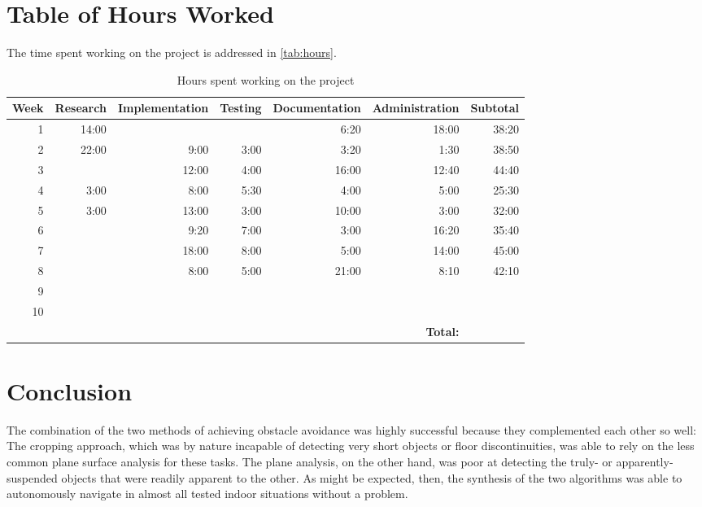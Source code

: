 \documentclass[12pt]{report}
\begin{document}
\section{Table of Hours Worked}
The time spent working on the project is addressed in \autoref{tab:hours}.
\begin{table}
\caption{Hours spent working on the project}
\label{tab:hours}
\begin{tabular}{| r | r | r | r | r | r | r |}
\hline
\scriptsize\textbf{Week} & \scriptsize\textbf{Research} & \scriptsize\textbf{Implementation} & \scriptsize\textbf{Testing} & \scriptsize\textbf{Documentation} & \scriptsize\textbf{Administration} & \scriptsize\textbf{Subtotal} \\
\hline\hline
1 & 14:00 &  &  & 6:20 & 18:00 & 38:20 \\
\hline
2 & 22:00 & 9:00 & 3:00 & 3:20 & 1:30 & 38:50 \\
\hline
3 &  & 12:00 & 4:00 & 16:00 & 12:40 & 44:40 \\
\hline
4 & 3:00 & 8:00 & 5:30 & 4:00 & 5:00 & 25:30 \\
\hline
5 & 3:00 & 13:00 & 3:00 & 10:00 & 3:00 & 32:00 \\
\hline
6 &  & 9:20 & 7:00 & 3:00 & 16:20 & 35:40 \\
\hline
7 &  & 18:00 & 8:00 & 5:00 & 14:00 & 45:00 \\
\hline
8 &  & 8:00 & 5:00 & 21:00 & 8:10 & 42:10 \\
\hline
9 &  &  &  &  &  & \\
\hline
10 &  &  &  &  &  & \\
\hline\hline
&&&&& \scriptsize\textbf{Total:} & \\
\hline
\end{tabular}
\end{table}

\section{Conclusion}
The combination of the two methods of achieving obstacle avoidance was highly successful because they complemented each other so well:  The cropping approach, which was by nature incapable of detecting very short objects or floor discontinuities, was able to rely on the less common plane surface analysis for these tasks.  The plane analysis, on the other hand, was poor at detecting the truly- or apparently-suspended objects that were readily apparent to the other.  As might be expected, then, the synthesis of the two algorithms was able to autonomously navigate in almost all tested indoor situations without a problem.
\end{document}
